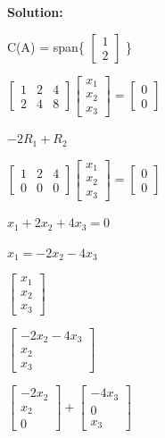 \documentclass[a4paper, 11pt]{article}
\begin{document}
\begin{enumerate}
\textbf{Solution:}

C(A) = span\{ 
$\begin{bmatrix} 1 \\ 2 \end{bmatrix}$ \}

$\begin{bmatrix} 
1 & 2 & 4 \\ 2 & 4 & 8
\end{bmatrix}
\begin{bmatrix} 
x_1 \\ x_2 \\ x_3
\end{bmatrix}
 = 
 \begin{bmatrix}
 0 \\ 0 
\end{bmatrix}
$

$-2R_1 + R_2$

$\begin{bmatrix} 
1 & 2 & 4 \\ 0 & 0 & 0
\end{bmatrix}
\begin{bmatrix} 
x_1 \\ x_2 \\ x_3
\end{bmatrix}
 = 
 \begin{bmatrix}
 0 \\ 0 
\end{bmatrix}
$

$x_1 + 2x_2 + 4x_3 = 0$

$x_1 = -2x_2 - 4x_3$

$\begin{bmatrix} 
x_1 \\ x_2 \\ x_3
\end{bmatrix}$

$\begin{bmatrix} 
-2x_2 - 4x_3 \\ x_2 \\ x_3
\end{bmatrix}$

$\begin{bmatrix} 
-2x_2 \\ x_2 \\ 0
\end{bmatrix}
 +
\begin{bmatrix} 
-4x_3 \\ 0 \\ x_3
\end{bmatrix}
$


\end{enumerate}
\end{document}
